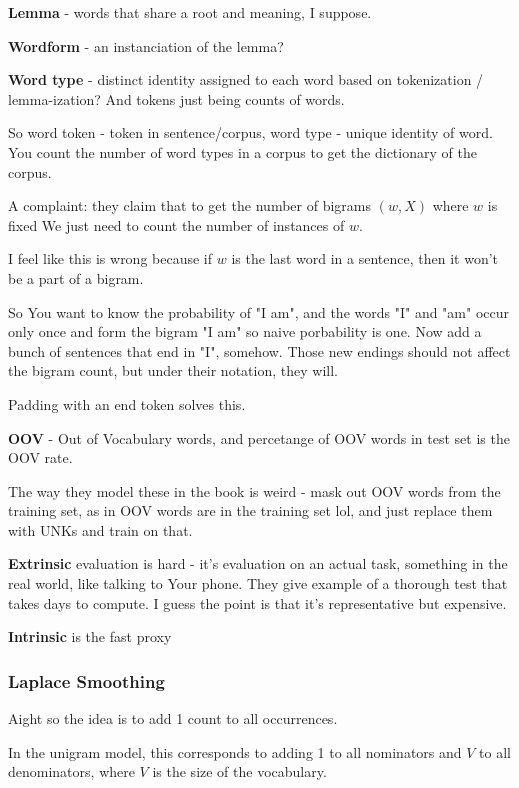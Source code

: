 \documentclass{article}
\begin{document}
		\textbf{Lemma} - words that share a root and meaning, I suppose.
		
		\textbf{Wordform} - an instanciation of the lemma?
		
		\textbf{Word type} - distinct identity assigned to each word based on tokenization / lemma-ization? And tokens just being counts of words.
		
		So word token - token in sentence/corpus, word type - unique identity of word. You count the number of word types in a corpus to get the dictionary of the corpus.		
		
		A complaint: they claim that to get the number of bigrams $(w, X)$ where $w$ is fixed We just need to count the number of instances of $w$.
		
		I feel like this is wrong because if $w$ is the last word in a sentence, then it won't be a part of a bigram.
		
		So You want to know the probability of "I am", and the words "I" and "am" occur only once and form the bigram "I am" so naive porbability is one. Now add a bunch of sentences that end in "I", somehow. Those new endings should not affect the bigram count, but under their notation, they will.
		
		Padding with an end token solves this.
		
		\textbf{OOV} - Out of Vocabulary words, and percetange of OOV words in test set is the OOV rate.
		
		The way they model these in the book is weird - mask out OOV words from the training set, as in OOV words are in the training set lol, and just replace them with UNKs and train on that.
		
		\textbf{Extrinsic} evaluation is hard - it's evaluation on an actual task, something in the real world, like talking to Your phone. They give example of a thorough test that takes days to compute. I guess the point is that it's representative but expensive.
		
		\textbf{Intrinsic} is the fast proxy
		
		\subsubsection{Laplace Smoothing}
		
			Aight so the idea is to add 1 count to all occurrences.
			
			In the unigram model, this corresponds to adding 1 to all nominators and $V$ to all denominators, where $V$ is the size of the vocabulary.
			
\end{document}
